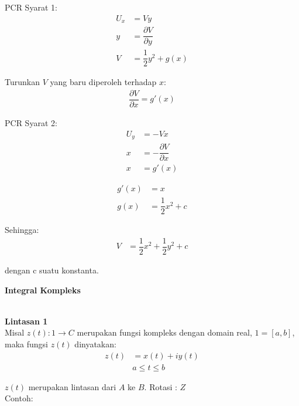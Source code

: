 \documentclass{article}
\begin{document}
PCR Syarat 1:
\begin{align}
    U_x & = Vy
    \nonumber                              \\
    y   & = \dfrac{\partial V}{\partial y}
    \nonumber                              \\
    V   & = \dfrac{1}{2} y^2 + g(x)
    \nonumber
\end{align}

Turunkan $V$ yang baru diperoleh terhadap $x$:
\begin{align}
    \dfrac{\partial V}{\partial x} = g'(x)
    \nonumber
\end{align}

PCR Syarat 2:
\begin{align}
    U_y & = -Vx
    \nonumber                               \\
    x   & = -\dfrac{\partial V}{\partial x}
    \nonumber                               \\
    x   & = g'(x)
    \nonumber
\end{align}

\begin{align}
    g'(x) & = x
    \nonumber                      \\
    g(x)  & = \dfrac{1}{2} x^2 + c
    \nonumber
\end{align}

Sehingga:
\begin{align}
    V & = \dfrac{1}{2} x^2 + \dfrac{1}{2} y^2 + c
    \nonumber
\end{align}

dengan c suatu konstanta.


\newpage
\begin{center}
    \textbf{Integral Kompleks}
\end{center}
\leavevmode\\

\textbf{Lintasan 1}
\\

Misal $z(t) : 1 \rightarrow C$ merupakan fungsi kompleks dengan domain real, $1=[a,b]$, maka fungsi $z(t)$ dinyatakan:
\begin{align}
    z(t) & = x(t) + iy(t)
    \nonumber              \\
         & a \leq t \leq b
    \nonumber
\end{align}


$z(t)$ merupakan lintasan dari $A$ ke $B$. Rotasi : $Z$\\

Contoh:
\end{document}
